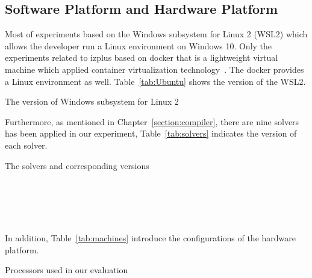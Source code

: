\subsection{Software Platform and Hardware Platform}
\label{sec:softplat}
Most of experiments based on the Windows subsystem for Linux 2 (WSL2) which allows the developer run a Linux environment on Windows 10. Only the experiments related to izplus based on docker that is a lightweight virtual machine which applied container virtualization technology~\cite{r25}. The docker provides a Linux environment as well. Table~\ref{tab:Ubuntu} shows the version of the WSL2.
\begin{table}[htbp]
  \centering

  \caption{The version of Windows subsystem for Linux 2}
  
  \label{tab:Ubuntu}
  
\end{table}
Furthermore, as mentioned in Chapter~\ref{section:compiler}, there are nine solvers has been applied in our experiment, Table~\ref{tab:solvers} indicates the version of each solver.
\begin{table}[htbp]
  \centering

  \caption{The solvers and corresponding versions}
  
  \label{tab:solvers}
  	\begin{subtable}[b]{\textwidth}
  	\centering
  
    \end{subtable}\\
    	\begin{subtable}[b]{\textwidth}
  	\centering
  
  \end{subtable}\\
  \begin{subtable}[b]{\textwidth}
  \centering
  
  \end{subtable}
\end{table}
\\In addition, Table~\ref{tab:machines} introduce the configurations of the hardware platform.
\begin{table}[htbp]
  \centering

  \caption{Processors used in our evaluation}
  
  \label{tab:machines}
  
\end{table}



